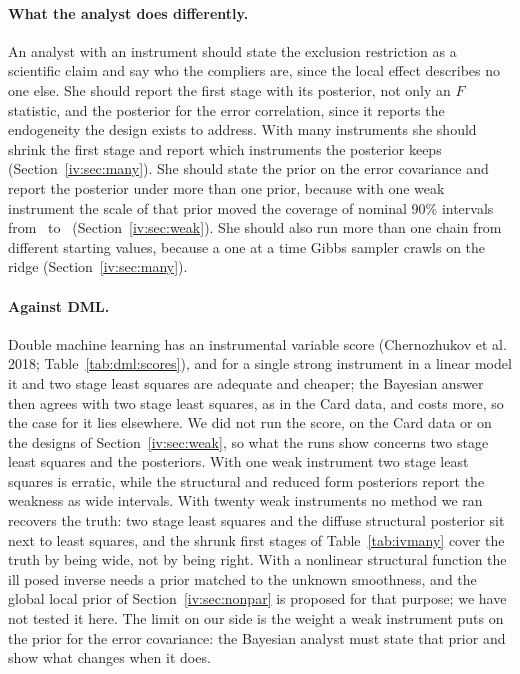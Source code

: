 \paragraph{What the analyst does differently.} An analyst with an instrument should state the exclusion restriction as a scientific claim and say who the compliers are, since the local effect describes no one else. She should report the first stage with its posterior, not only an $F$ statistic, and the posterior for the error correlation, since it reports the endogeneity the design exists to address. With many instruments she should shrink the first stage and report which instruments the posterior keeps (Section~\ref{iv:sec:many}). She should state the prior on the error covariance and report the posterior under more than one prior, because with one weak instrument the scale of that prior moved the coverage of nominal 90\% intervals from \ivscaledefcov\ to \ivscalehundcov\ (Section~\ref{iv:sec:weak}). She should also run more than one chain from different starting values, because a one at a time Gibbs sampler crawls on the ridge (Section~\ref{iv:sec:many}).

\paragraph{Against DML.} Double machine learning has an instrumental variable score (Chernozhukov et al. 2018; Table~\ref{tab:dml:scores}), and for a single strong instrument in a linear model it and two stage least squares are adequate and cheaper; the Bayesian answer then agrees with two stage least squares, as in the Card data, and costs more, so the case for it lies elsewhere. We did not run the score, on the Card data or on the designs of Section~\ref{iv:sec:weak}, so what the runs show concerns two stage least squares and the posteriors. With one weak instrument two stage least squares is erratic, while the structural and reduced form posteriors report the weakness as wide intervals. With twenty weak instruments no method we ran recovers the truth: two stage least squares and the diffuse structural posterior sit next to least squares, and the shrunk first stages of Table~\ref{tab:ivmany} cover the truth by being wide, not by being right. With a nonlinear structural function the ill posed inverse needs a prior matched to the unknown smoothness, and the global local prior of Section~\ref{iv:sec:nonpar} is proposed for that purpose; we have not tested it here. The limit on our side is the weight a weak instrument puts on the prior for the error covariance: the Bayesian analyst must state that prior and show what changes when it does.

